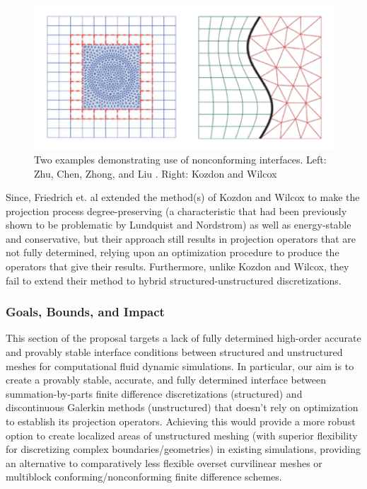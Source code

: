 \begin{figure}
\centering
\includegraphics[width=0.8\linewidth,trim=4 4 4 4,clip]{figures/nonconforming_samples.png}
\caption{Two examples demonstrating use of nonconforming interfaces. Left: Zhu, Chen, Zhong, and Liu \cite{zhu2011hybrid}.
	 Right: Kozdon and Wilcox \cite{kozdon2016stable}}
\label{fig:nonconforming_samples}
\end{figure}

Since, Friedrich et. al extended the method(s) of Kozdon and Wilcox to make the
projection process degree-preserving (a characteristic that had been
previously shown to be problematic by Lundquist and Nordstrom) as well as
energy-stable and conservative, but their approach still results in projection
operators that are not fully determined, relying upon an optimization procedure
to produce the operators that give their results. Furthermore, unlike Kozdon
and Wilcox, they fail to extend their method to hybrid structured-unstructured
discretizations.

\subsubsection{Goals, Bounds, and Impact}

This section of the proposal targets a lack of fully determined high-order
accurate and provably stable interface conditions between structured and unstructured
meshes for computational fluid dynamic simulations. In particular, our aim
is to create a provably stable, accurate, and fully determined interface between
summation-by-parts finite difference discretizations (structured) and discontinuous
Galerkin methods (unstructured) that doesn't rely on optimization to establish its
projection operators. Achieving this would provide a more robust option to create
localized areas of unstructured meshing (with superior flexibility for discretizing
complex boundaries/geometries) in existing simulations, providing an alternative to
comparatively less flexible overset curvilinear meshes or multiblock conforming/nonconforming
finite difference schemes.

